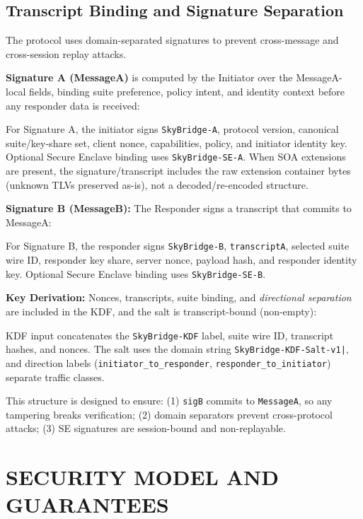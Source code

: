 \documentclass[10pt,journal,compsoc]{IEEEtran}
\begin{document}
\subsection{Transcript Binding and Signature
Separation}\label{f.-transcript-binding-and-signature-separation}

The protocol uses domain-separated signatures to prevent cross-message
and cross-session replay attacks.

\textbf{Signature A (MessageA)} is computed by the Initiator over the
MessageA-local fields, binding suite preference, policy intent, and
identity context before any responder data is received:

For Signature A, the initiator signs \texttt{SkyBridge-A}, protocol
version, canonical suite/key-share set, client nonce, capabilities,
policy, and initiator identity key. Optional Secure Enclave binding
uses \texttt{SkyBridge-SE-A}.
When SOA extensions are present, the signature/transcript includes the
raw extension container bytes (unknown TLVs preserved as-is), not a
decoded/re-encoded structure.

\textbf{Signature B (MessageB):} The Responder signs a transcript that
commits to MessageA:

For Signature B, the responder signs \texttt{SkyBridge-B},
\texttt{transcriptA}, selected suite wire ID, responder key share,
server nonce, payload hash, and responder identity key. Optional Secure
Enclave binding uses \texttt{SkyBridge-SE-B}.

\textbf{Key Derivation:} Nonces, transcripts, suite binding, and
\emph{directional separation} are included in the KDF, and the salt is
transcript-bound (non-empty):

KDF input concatenates the \texttt{SkyBridge-KDF} label, suite wire ID,
transcript hashes, and nonces. The salt uses the domain string
\texttt{SkyBridge-KDF-Salt-v1|}, and direction labels
(\texttt{initiator\_to\_responder}, \texttt{responder\_to\_initiator})
separate traffic classes.


This structure is designed to ensure: (1) \texttt{sigB} commits to \texttt{MessageA},
so any tampering breaks verification; (2) domain separators prevent
cross-protocol attacks; (3) SE signatures are session-bound and
non-replayable.



\section{SECURITY MODEL AND
GUARANTEES}\label{sec:security-model}
\end{document}

